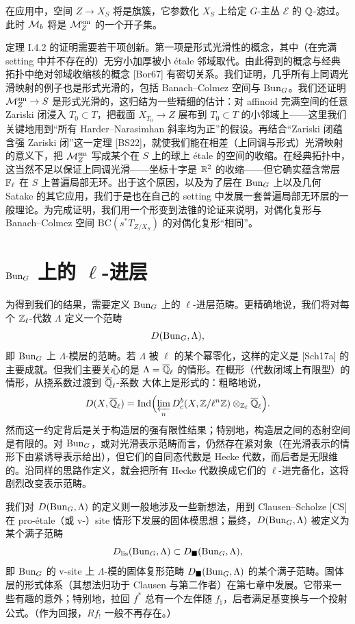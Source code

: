 在应用中，空间 $Z\to X_S$ 将是旗簇，它参数化 $X_S$ 上给定 $G$-主丛 $\mathcal{E}$ 的 $\mathbb{Q}$-滤过。此时 $\mathcal{M}_b$ 将是 $\mathcal{M}_Z^{\mathrm{sm}}$ 的一个开子集。

定理 I.4.2 的证明需要若干项创新。第一项是形式光滑性的概念，其中（在完满 setting 中并不存在的）无穷小加厚被小 étale 邻域取代。由此得到的概念与经典拓扑中绝对邻域收缩核的概念 [Bor67] 有密切关系。我们证明，几乎所有上同调光滑映射的例子也是形式光滑的，包括 Banach–Colmez 空间与 $\mathrm{Bun}_G$。我们还证明 $\mathcal{M}_Z^{\mathrm{sm}}\to S$ 是形式光滑的，这归结为一些精细的估计：对 affinoid 完满空间的任意 Zariski 闭浸入 $T_0\subset T$，把截面 $X_{T_0}\to Z$ 展布到 $T_0\subset T$ 的小邻域上——这里我们关键地用到“所有 Harder–Narasimhan 斜率均为正”的假设。再结合“Zariski 闭蕴含强 Zariski 闭”这一定理 [BS22]，就使我们能在相差（上同调与形式）光滑映射的意义下，把 $\mathcal{M}_Z^{\mathrm{sm}}$ 写成某个在 $S$ 上的球上 étale 的空间的收缩。在经典拓扑中，这当然不足以保证上同调光滑——坐标十字是 $\mathbb{R}^2$ 的收缩——但它确实蕴含常层 $\mathbb{F}_\ell$ 在 $S$ 上普遍局部无环。出于这个原因，以及为了层在 $\mathrm{Bun}_G$ 上以及几何 Satake 的其它应用，我们于是也在自己的 setting 中发展一套普遍局部无环层的一般理论。为完成证明，我们用一个形变到法锥的论证来说明，对偶化复形与 Banach–Colmez 空间 $\mathrm{BC}(s^*T_{Z/X_S})$ 的对偶化复形“相同”。

\section{$\mathrm{Bun}_G$ 上的 $\ell$-进层}

为得到我们的结果，需要定义 $\mathrm{Bun}_G$ 上的 $\ell$-进层范畴。更精确地说，我们将对每个 $\mathbb{Z}_\ell$-代数 $\Lambda$ 定义一个范畴
\[
D(\mathrm{Bun}_G,\Lambda),
\]
即 $\mathrm{Bun}_G$ 上 $\Lambda$-模层的范畴。若 $\Lambda$ 被 $\ell$ 的某个幂零化，这样的定义是 [Sch17a] 的主要成就。但我们主要关心的是 $\Lambda=\overline{\mathbb{Q}}_\ell$ 的情形。在概形（代数闭域上有限型）的情形，从挠系数过渡到 $\overline{\mathbb{Q}}_\ell$-系数 大体上是形式的：粗略地说，
\[
D(X,\overline{\mathbb{Q}}_\ell)=\operatorname{Ind}\Bigl(\varprojlim_n D^b_c(X,\mathbb{Z}/\ell^n\mathbb{Z})\otimes_{\mathbb{Z}_\ell}\overline{\mathbb{Q}}_\ell\Bigr).
\]
然而这一约定背后是关于构造层的强有限性结果；特别地，构造层之间的态射空间是有限的。对 $\mathrm{Bun}_G$，或对光滑表示范畴而言，仍然存在紧对象（在光滑表示的情形下由紧诱导表示给出），但它们的自同态代数是 Hecke 代数，而后者是无限维的。沿同样的思路作定义，就会把所有 Hecke 代数换成它们的 $\ell$-进完备化，这将剧烈改变表示范畴。

我们对 $D(\mathrm{Bun}_G,\Lambda)$ 的定义则一般地涉及一些新想法，用到 Clausen–Scholze [CS] 在 pro-étale（或 v-）site 情形下发展的固体模思想；最终，$D(\mathrm{Bun}_G,\Lambda)$ 被定义为某个满子范畴
\[
D_{\mathrm{lis}}(\mathrm{Bun}_G,\Lambda)\subset D_{\blacksquare}(\mathrm{Bun}_G,\Lambda),
\]
即 $\mathrm{Bun}_G$ 的 v-site 上 $\Lambda$-模的固体复形范畴 $D_{\blacksquare}(\mathrm{Bun}_G,\Lambda)$ 的某个满子范畴。固体层的形式体系（其想法归功于 Clausen 与第二作者）在第七章中发展。它带来一些有趣的意外；特别地，拉回 $f^*$ 总有一个左伴随 $f_\natural$，后者满足基变换与一个投射公式。（作为回报，$Rf_!$ 一般不再存在。）


